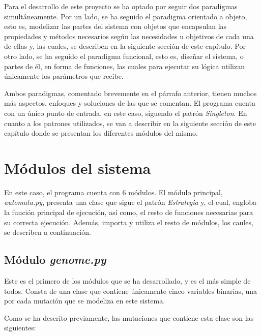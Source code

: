 Para el desarrollo de este proyecto se ha optado por seguir dos paradigmas simultáneamente. Por un lado,
se ha seguido el paradigma orientado a objeto, esto es, modelizar las partes del sistema con objetos que encapsulan
las propiedades y métodos necesarios según las necesidades u objetivos de cada una de ellas y, las cuales,
se describen en la siguiente sección de este capítulo. Por otro lado, se ha seguido el paradigma funcional, esto es,
diseñar el sistema, o partes de él, en forma de funciones, las cuales para ejecutar su lógica utilizan únicamente
los parámetros que recibe.

Ambos paradigmas, comentado brevemente en el párrafo anterior, tienen muchos más aspectos, enfoques y soluciones
de las que se comentan. El programa cuenta con un único punto de entrada, en este caso, siguendo el patrón
\textit{Singleton}. En cuanto a los patrones utilizados, se van a describir en la siguiente sección de este
capítulo donde se presentan los diferentes módulos del mismo.



\section{Módulos del sistema}

En este caso, el programa cuenta con 6 módulos. El módulo principal, \textit{automata.py}, presenta
una clase que sigue el patrón \textit{Estrategia} y, el cual, engloba la función principal de ejecución,
así como, el resto de funciones necesarias para su correcta ejecución. Además, importa y utiliza
el resto de módulos, los caules, se describen a continuación.

\subsection{Módulo \textit{genome.py}}

Este es el primero de los módulos que se ha desarrollado, y es el más simple de todos. Consta de
una clase que contiene únicamente cinco variables binarias, una por cada mutación que se
modeliza en este sistema.

Como se ha descrito previamente, las mutaciones que contiene esta clase son las siguientes:

